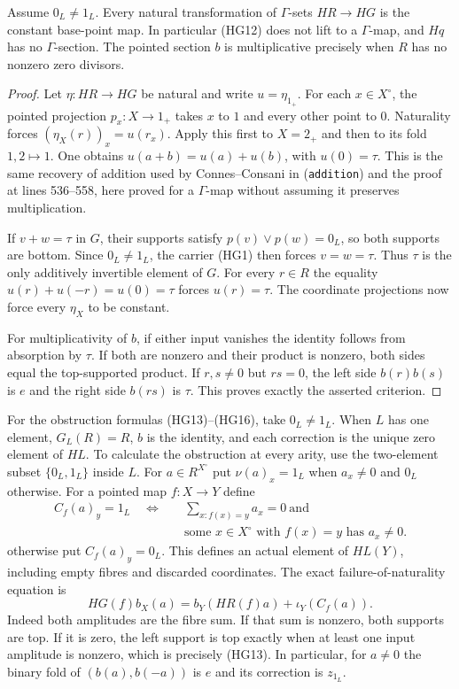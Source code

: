 \begin{theorem}\label{HG:nosection}
Assume $0_L\ne1_L$.  Every natural transformation of
$\Gamma$-sets $HR\to HG$ is the constant base-point map.
In particular (HG12) does not lift to a $\Gamma$-map, and
$Hq$ has no $\Gamma$-section.  The pointed section $b$ is
multiplicative precisely when $R$ has no nonzero zero divisors.
\end{theorem}
\begin{proof}
Let $\eta:HR\to HG$ be natural and write $u=\eta_{1_+}$.
For each $x\in X^\circ$, the pointed projection
$p_x:X\to1_+$ takes $x$ to $1$ and every other point to $0$.
Naturality forces $(\eta_X(r))_x=u(r_x)$.  Apply this first to
$X=2_+$ and then to its fold $1,2\mapsto1$.  One obtains
$u(a+b)=u(a)+u(b)$, with $u(0)=\tau$.  This is the same
recovery of addition used by Connes--Consani in (\texttt{addition})
and the proof at lines 536--558, here proved for a $\Gamma$-map
without assuming it preserves multiplication.

If $v+w=\tau$ in $G$, their supports satisfy
$p(v)\vee p(w)=0_L$, so both supports are bottom.  Since
$0_L\ne1_L$, the carrier (HG1) then forces $v=w=\tau$.
Thus $\tau$ is the only additively invertible element of $G$.
For every $r\in R$ the equality $u(r)+u(-r)=u(0)=\tau$
forces $u(r)=\tau$.  The coordinate projections now force
every $\eta_X$ to be constant.

For multiplicativity of $b$, if either input vanishes the
identity follows from absorption by $\tau$.  If both are
nonzero and their product is nonzero, both sides equal the
top-supported product.  If $r,s\ne0$ but $rs=0$, the left
side $b(r)b(s)$ is $e$ and the right side $b(rs)$ is $\tau$.
This proves exactly the asserted criterion.
\end{proof}

For the obstruction formulas (HG13)--(HG16), take $0_L\ne1_L$.
When $L$ has one element, $G_L(R)=R$, $b$ is the identity,
and each correction is the unique zero element of $HL$.
To calculate the obstruction at every arity, use the two-element
subset $\{0_L,1_L\}$ inside $L$.  For $a\in R^{X^\circ}$
put $\nu(a)_x=1_L$ when $a_x\ne0$ and $0_L$ otherwise.
For a pointed map $f:X\to Y$ define
\begin{equation}\tag{HG13}
 \begin{aligned}
 C_f(a)_y=1_L\quad\Longleftrightarrow\quad
 &\sum_{x:f(x)=y}a_x=0\ \text{and}\\
 &\text{some }x\in X^\circ\text{ with }f(x)=y\text{ has }a_x\ne0.
 \end{aligned}
\end{equation}
otherwise put $C_f(a)_y=0_L$.  This defines an actual element of
$HL(Y)$, including empty fibres and discarded coordinates.
The exact failure-of-naturality equation is
\begin{equation}\tag{HG14}
 HG(f)b_X(a)=b_Y(HR(f)a)+\iota_Y(C_f(a)).
\end{equation}
Indeed both amplitudes are the fibre sum.  If that sum is nonzero,
both supports are top.  If it is zero, the left support is top
exactly when at least one input amplitude is nonzero, which is
precisely (HG13).  In particular, for $a\ne0$ the binary fold
of $(b(a),b(-a))$ is $e$ and its correction is $z_{1_L}$.

